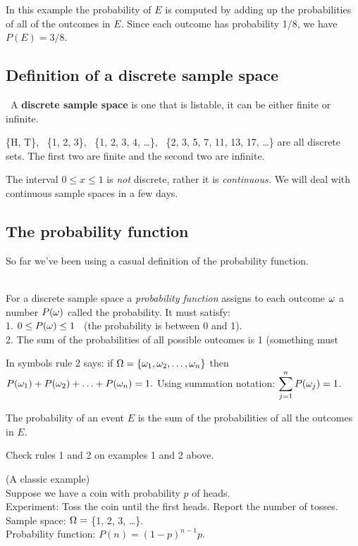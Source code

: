 In this example the probability of $E$ is computed by
adding up the probabilities of all of the outcomes in
$E$. Since each outcome has probability 1/8, we have $P(E) = 3/8$.

\subsection{Definition of a discrete sample space}
 \, A \textbf{discrete sample space} is one that is 
listable, it can be either finite or infinite.

\examples \{H, T\}, \, \{1, 2, 3\}, \, \{1, 2, 3, 4, \ldots\}, \,
\{2, 3, 5, 7, 11, 13, 17, \ldots\} are all discrete sets. The first two
are finite and the second two are infinite.

\example The interval $0 \le x \le 1$ 
is \emph{not} discrete, rather it is \emph{continuous.} We will deal with 
continuous sample spaces in a few days.

\subsection{The probability function}

So far we've been using a casual definition of the probability function.

\\
For a discrete sample space a \emph{probability function} assigns to each
outcome $\omega$ a number $P(\omega)$ called the probability. It must satisfy:\\
1. $0 \le P(\omega) \le 1$ \, (the probability is between 0 and 1).\\
2. The sum of the probabilities of all possible outcomes is 1 (something must

In symbols rule 2 says: if $\Omega = \{\omega_1, \omega_2, \ldots, \omega_n\}$ then
$P(\omega_1) + P(\omega_2) + \ldots + P(\omega_n) = 1.$  Using summation notation:
$\displaystyle{\sum_{j=1}^n P(\omega_j) = 1}$.

The probability of an event $E$ is the sum of the probabilities of 
all the outcomes in $E$.

\problem Check rules 1 and 2 on examples 1 and 2 above.

\medskip


\numexamp (A classic example)\\
Suppose we have a coin with probability $p$ of heads.\\
Experiment: Toss the coin until the first heads. Report the number of tosses.\\
Sample space: $\Omega = $ \{1, 2, 3, \ldots\}.\\
Probability function: $P(n) = (1-p)^{n-1}p$.

